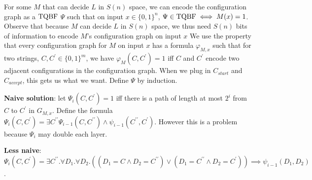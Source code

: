 \begin{note}
  For some $M$ that can decide $L$ in $S(n)$ space, we can encode the
  configuration graph as a $\mathrm{TQBF}$ $\Psi$
  such that on input $x \in \{0, 1\}^n$, $\Psi \in \mathrm{TQBF} \iff M(x) = 1$.
  Observe that because $M$ can decide $L$ in $S(n)$ space, we thus need
  $S(n)$ bits of information to encode $M$'s configuration graph on input $x$
  We use the property that every configuration graph for $M$ on input $x$ has
  a formula $\varphi_{M, x}$ such that for two strings,
  $C, C^\prime \in \{0, 1\}^m$, we have $\varphi_{M} (C, C^\prime) = 1$
  iff $C$ and $C^\prime$ encode two adjacent configurations in the
  configuration graph.
  When we plug in $C_{start}$ and $C_{accept}$, this gets us what we want.
  Define $\Psi$ by induction.

  \textbf{Naive solution}: let $\Psi_i (C, C^\prime) = 1$ iff there is a
  path of length at most $2^i$ from $C$ to $C^\prime$ in $G_{M, x}$.
  Define the formula
  $\Psi_{i} (C, C^\prime) = \exists C^{\prime \prime}
    \Psi_{i - 1} (C, C^{\prime \prime}) \land
    \psi_{i - 1} (C^{\prime \prime}, C^\prime)$.
  However this is a problem because $\Psi_i$ may double each layer.

  \textbf{Less naive}:
  $\Psi_{i} (C,C^\prime)=\exists C^{\prime\prime} . \forall D_1 . \forall D_2.
  \left( (D_1 = C \land D_2 = C^{\prime \prime}) \lor
         (D_1 = C^{\prime \prime} \land D_2 = C^\prime) \right) \implies
    \psi_{i - 1} (D_1, D_2)$.
\end{note}


